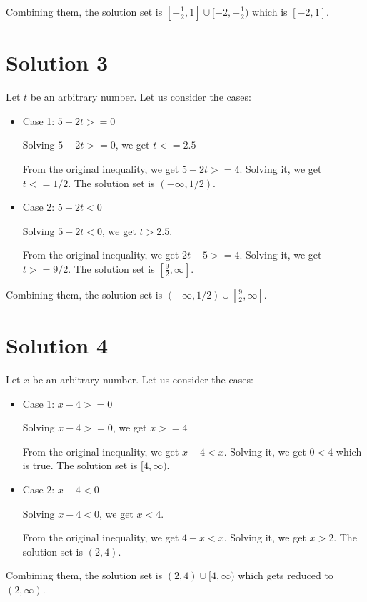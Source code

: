 \documentclass{article}
\begin{document}
Combining them, the solution set is
$[-\frac{1}{2}, 1] \cup [-2, -\frac{1}{2})$ which is $[-2, 1]$.

\section{Solution 3}

Let $t$ be an arbitrary number. Let us consider the cases:

\begin{itemize}
\item Case 1: $5 - 2t >= 0$

  Solving $5 - 2t >= 0$, we get $t <= 2.5$

  From the original inequality, we get $5 - 2t >= 4$. Solving it, we
  get $t <= 1/2$. The solution set is $(-\infty, 1/2)$.

\item Case 2: $5 - 2t < 0$

  Solving $5 - 2t < 0$, we get $t > 2.5$.

  From the original inequality, we get $2t - 5 >= 4$. Solving it, we
  get $t >= 9/2$. The solution set is $[\frac{9}{2}, \infty]$.
\end{itemize}


Combining them, the solution set is $(-\infty, 1/2) \cup [\frac{9}{2},
\infty]$.

\section{Solution 4}

Let $x$ be an arbitrary number. Let us consider the cases:

\begin{itemize}
\item Case 1: $x - 4 >= 0$

  Solving $x - 4 >= 0$, we get $x >= 4$

  From the original inequality, we get $x - 4 < x$. Solving it, we
  get $0 < 4$ which is true. The solution set is $[4, \infty)$.

\item Case 2: $x - 4 < 0$

  Solving $x - 4 < 0$, we get $x < 4$.

  From the original inequality, we get $4 - x < x$. Solving it, we
  get $x > 2$. The solution set is $(2, 4)$.
\end{itemize}

Combining them, the solution set is $(2, 4) \cup [4, \infty)$ which
gets reduced to $(2,\infty)$.
\end{document}
